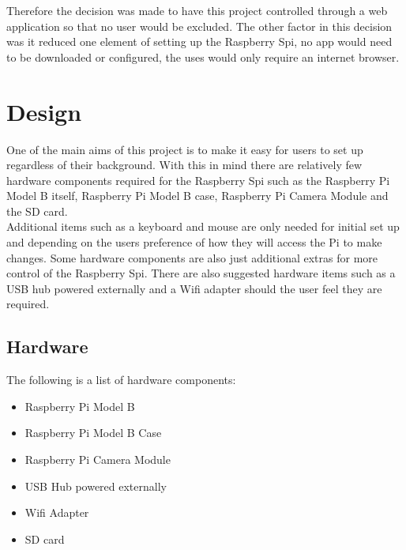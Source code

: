 \documentclass[12pt]{report}
\begin{document}
Therefore the decision was made to have this project controlled through a web application so that no user would be excluded. The other factor in this decision was it reduced one element of setting up the Raspberry Spi, no app would need to be downloaded or configured, the uses would only require an internet browser.\\

% 
\chapter{Design}
\label{ch:design}
	One of the main aims of this project is to make it easy for users to set up regardless of their background. With this in mind there are relatively few hardware components required for the Raspberry Spi such as the Raspberry Pi Model B itself, Raspberry Pi Model B case, Raspberry Pi Camera Module and the SD card.\\
	 
Additional items such as a keyboard and mouse are only needed for initial set up and depending on the users preference of how they will access the Pi to make changes. Some hardware components are also just additional extras for more control of the Raspberry Spi. There are also suggested hardware items such as a USB hub powered externally and a Wifi adapter should the user feel they are required.\\


\section{Hardware}	
\label{sec:hardware}

The following is a list of hardware components:\\
\begin{itemize}
  \item Raspberry Pi Model B\\
  \item Raspberry Pi Model B Case\\
  \item Raspberry Pi Camera Module\\
  \item USB Hub powered externally\\
  \item Wifi Adapter\\
  \item SD card\\
\end{itemize} 
\end{document}
